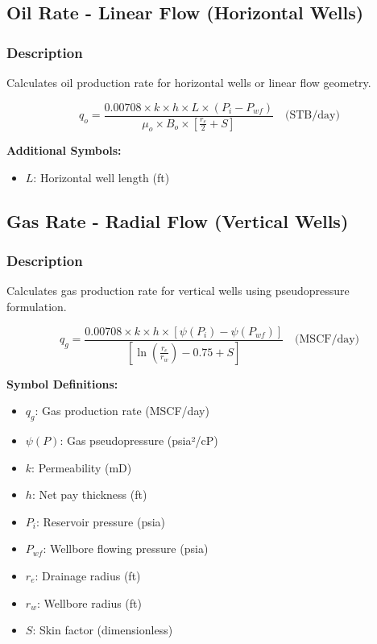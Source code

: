 \documentclass[11pt,a4paper]{article}
\newcommand{\symitem}[2]{\item \textbf{#1}: #2}
\begin{document}
\subsection{Oil Rate - Linear Flow (Horizontal Wells)}

\subsubsection{Description}
Calculates oil production rate for horizontal wells or linear flow geometry.

\begin{tcolorbox}[colback=formulabox,colframe=black!75]
\begin{equation}
q_o = \frac{0.00708 \times k \times h \times L \times (P_i - P_{wf})}{\mu_o \times B_o \times \left[\frac{r_e}{2} + S\right]} \quad \text{(STB/day)}
\end{equation}
\end{tcolorbox}

\textbf{Additional Symbols:}
\begin{itemize}[leftmargin=2cm]
\symitem{$L$}{Horizontal well length (ft)}
\end{itemize}

\subsection{Gas Rate - Radial Flow (Vertical Wells)}

\subsubsection{Description}
Calculates gas production rate for vertical wells using pseudopressure formulation.

\begin{tcolorbox}[colback=formulabox,colframe=black!75]
\begin{equation}
q_g = \frac{0.00708 \times k \times h \times [\psi(P_i) - \psi(P_{wf})]}{\left[\ln\left(\frac{r_e}{r_w}\right) - 0.75 + S\right]} \quad \text{(MSCF/day)}
\end{equation}
\end{tcolorbox}

\textbf{Symbol Definitions:}
\begin{itemize}[leftmargin=2cm]
\symitem{$q_g$}{Gas production rate (MSCF/day)}
\symitem{$\psi(P)$}{Gas pseudopressure (psia²/cP)}
\symitem{$k$}{Permeability (mD)}
\symitem{$h$}{Net pay thickness (ft)}
\symitem{$P_i$}{Reservoir pressure (psia)}
\symitem{$P_{wf}$}{Wellbore flowing pressure (psia)}
\symitem{$r_e$}{Drainage radius (ft)}
\symitem{$r_w$}{Wellbore radius (ft)}
\symitem{$S$}{Skin factor (dimensionless)}
\end{itemize}
\end{document}
